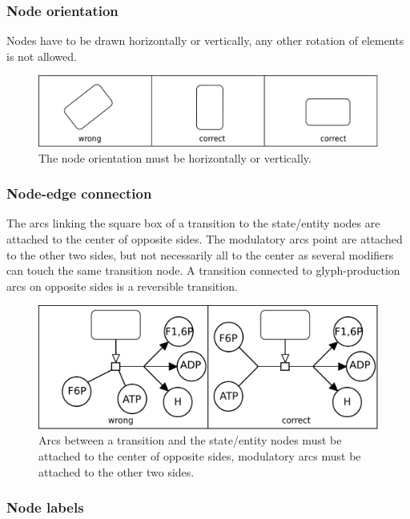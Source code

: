 \subsubsection{Node orientation}

Nodes have to be drawn horizontally or vertically, any other
rotation of elements is not allowed.

\begin{figure}[h!]
  \centering
  \includegraphics[scale=0.3]{images/layout-orientation}
  \caption{The node orientation must be horizontally or
  vertically.}\label{layout5}
\end{figure}

\subsubsection{Node-edge connection}

The arcs linking the square box of a transition to the state/entity
nodes are attached to the center of opposite sides. The modulatory
arcs point are attached to the other two sides, but not necessarily
all to the center as several modifiers can touch the same transition
node. A transition connected to glyph-production arcs on opposite
sides is a reversible transition.

\begin{figure}[h!]
  \centering
  \includegraphics[scale=0.3]{images/layout-connecting-arcs}
  \caption{Arcs between a transition and the state/entity
  nodes must be attached to the center of opposite sides, modulatory
  arcs must be attached to the other two sides.}\label{layout6}
\end{figure}

\subsubsection{Node labels}

